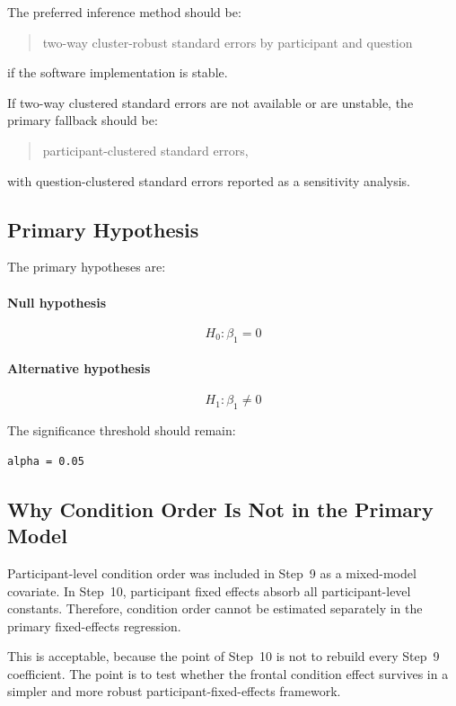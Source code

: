 The preferred inference method should be:
\begin{quote}
two-way cluster-robust standard errors by participant and question
\end{quote}
if the software implementation is stable.

If two-way clustered standard errors are not available or are unstable, the primary fallback should be:
\begin{quote}
participant-clustered standard errors,
\end{quote}
with question-clustered standard errors reported as a sensitivity analysis.

\subsection{Primary Hypothesis}
The primary hypotheses are:

\paragraph{Null hypothesis}
\begin{equation}
H_0: \beta_1 = 0
\end{equation}

\paragraph{Alternative hypothesis}
\begin{equation}
H_1: \beta_1 \neq 0
\end{equation}

The significance threshold should remain:
\begin{verbatim}
alpha = 0.05
\end{verbatim}

\subsection{Why Condition Order Is Not in the Primary Model}
Participant-level condition order was included in Step~9 as a mixed-model covariate.
In Step~10, participant fixed effects absorb all participant-level constants.
Therefore, condition order cannot be estimated separately in the primary fixed-effects regression.

This is acceptable, because the point of Step~10 is not to rebuild every Step~9 coefficient.
The point is to test whether the frontal condition effect survives in a simpler and more robust
participant-fixed-effects framework.

